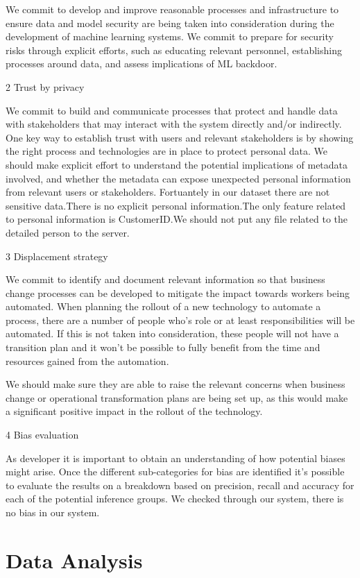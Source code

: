 We commit to develop and improve reasonable processes and infrastructure
to ensure data and model security are being taken into consideration
during the development of machine learning systems. We commit to prepare
for security risks through explicit efforts, such as educating relevant
personnel, establishing processes around data, and assess implications
of ML backdoor.

2 Trust by privacy

We commit to build and communicate processes that protect and handle
data with stakeholders that may interact with the system directly and/or
indirectly. One key way to establish trust with users and relevant
stakeholders is by showing the right process and technologies are in
place to protect personal data. We should make explicit effort to
understand the potential implications of metadata involved, and whether
the metadata can expose unexpected personal information from relevant
users or stakeholders. Fortuantely in our dataset there are not
sensitive data.There is no explicit personal information.The only
feature related to personal information is CustomerID.We should not put
any file related to the detailed person to the server.

3 Displacement strategy

We commit to identify and document relevant information so that business
change processes can be developed to mitigate the impact towards workers
being automated. When planning the rollout of a new technology to
automate a process, there are a number of people who's role or at least
responsibilities will be automated. If this is not taken into
consideration, these people will not have a transition plan and it won't
be possible to fully benefit from the time and resources gained from the
automation.

We should make sure they are able to raise the relevant concerns when
business change or operational transformation plans are being set up, as
this would make a significant positive impact in the rollout of the
technology.

4 Bias evaluation

As developer it is important to obtain an understanding of how potential
biases might arise. Once the different sub-categories for bias are
identified it's possible to evaluate the results on a breakdown based on
precision, recall and accuracy for each of the potential inference
groups. We checked through our system, there is no bias in our system.

\hypertarget{data-analysis}{%
\section{Data Analysis}\label{data-analysis}}

